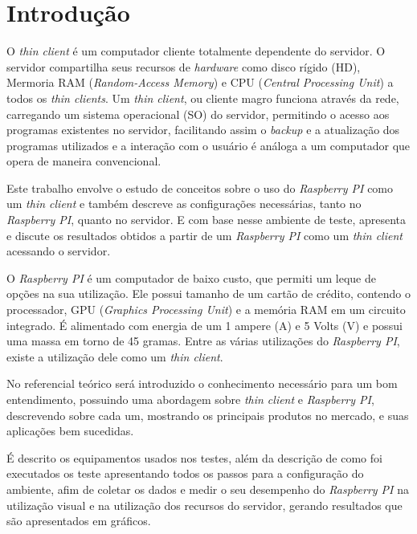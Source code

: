 \chapter{Introdução}



O \textit{thin client} é um computador cliente totalmente dependente do servidor. O servidor compartilha seus recursos de \textit{hardware} como disco rígido (HD), Mermoria RAM (\textit{Random-Access Memory}) e CPU (\textit{Central Processing Unit}) a todos os \textit{thin clients}. Um \textit{thin client}, ou cliente magro funciona através da rede, carregando um sistema operacional (SO) do servidor, permitindo o acesso aos programas existentes no servidor, facilitando assim o \textit{backup} e a atualização dos programas utilizados e a interação com o usuário é análoga a um computador que opera de maneira convencional.

Este trabalho envolve o estudo de conceitos sobre o uso do \textit{Raspberry PI} como um \textit{thin client} e também descreve as configurações necessárias, tanto no \textit{Raspberry PI}, quanto no servidor. E com base nesse ambiente de teste, apresenta e discute os resultados obtidos a partir de um \textit{Raspberry PI} como um \textit{thin client} acessando o servidor.

O \textit{Raspberry PI} é um computador de baixo custo, que permiti um leque de opções na sua utilização. Ele possui tamanho de um cartão de crédito, contendo o processador, GPU (\textit{Graphics Processing Unit}) e a memória RAM em um circuito integrado. É alimentado com energia de um 1 ampere (A) e 5 Volts (V) e possui uma massa em torno de 45 gramas. Entre as várias utilizações do \textit{Raspberry PI}, existe a utilização dele como um  \textit{thin client}.

No referencial teórico será introduzido o conhecimento necessário para um bom entendimento, possuindo uma abordagem sobre  \textit{thin client} e \textit{Raspberry PI}, descrevendo sobre cada um, mostrando os principais produtos no mercado, e suas aplicações bem sucedidas. 

É descrito os equipamentos usados nos testes, além da descrição de como foi executados os teste apresentando todos os passos para a configuração do ambiente, afim de coletar os dados e medir o seu desempenho do \textit{Raspberry PI} na utilização visual e na utilização dos recursos do servidor, gerando resultados que são apresentados em gráficos.
